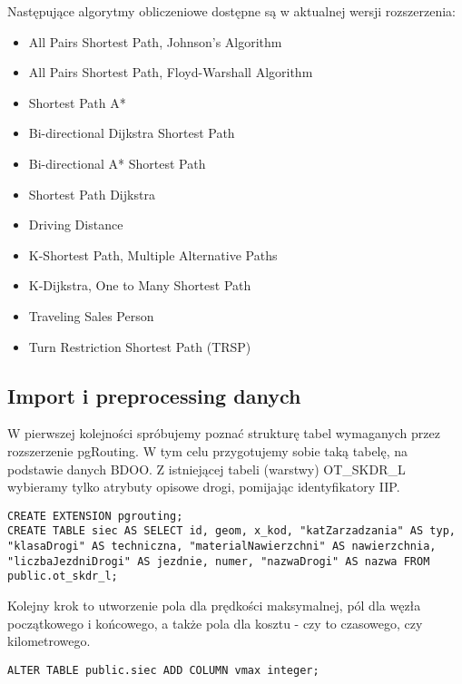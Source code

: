 	Następujące algorytmy obliczeniowe dostępne są w aktualnej wersji rozszerzenia:
	\begin{itemize}
		\item All Pairs Shortest Path, Johnson’s Algorithm
		\item All Pairs Shortest Path, Floyd-Warshall Algorithm
		\item Shortest Path A*
		\item Bi-directional Dijkstra Shortest Path
		\item Bi-directional A* Shortest Path
		\item Shortest Path Dijkstra
		\item Driving Distance
		\item K-Shortest Path, Multiple Alternative Paths
		\item K-Dijkstra, One to Many Shortest Path
		\item Traveling Sales Person
		\item Turn Restriction Shortest Path (TRSP)
		
	\end{itemize}
	
\subsection{Import i preprocessing danych}
W pierwszej kolejności spróbujemy poznać strukturę tabel wymaganych przez rozszerzenie pgRouting. W tym celu przygotujemy sobie taką tabelę, na podstawie danych BDOO. Z istniejącej tabeli (warstwy) OT\_SKDR\_L wybieramy tylko atrybuty opisowe drogi, pomijając identyfikatory IIP.


\begin{lstlisting}
CREATE EXTENSION pgrouting;
CREATE TABLE siec AS SELECT id, geom, x_kod, "katZarzadzania" AS typ, "klasaDrogi" AS techniczna, "materialNawierzchni" AS nawierzchnia, "liczbaJezdniDrogi" AS jezdnie, numer, "nazwaDrogi" AS nazwa FROM public.ot_skdr_l;
\end{lstlisting}

Kolejny krok to utworzenie pola dla prędkości maksymalnej, pól dla węzła początkowego i końcowego, a także pola dla kosztu - czy to czasowego, czy kilometrowego.

\begin{lstlisting}
ALTER TABLE public.siec ADD COLUMN vmax integer;
\end{lstlisting}

